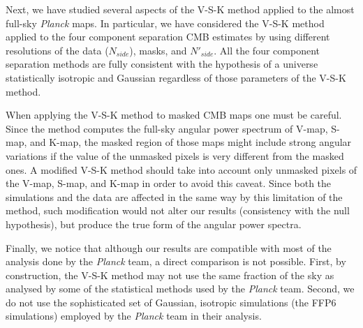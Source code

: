 Next, we have studied several aspects of the V-S-K method applied to the almost full-sky \textit{Planck} maps. In particular, we have considered the V-S-K method applied to the four component separation CMB estimates by using different resolutions of the data ($ N_{side} $), masks, and $ N'_{side} $. All the four component separation methods are fully consistent with the hypothesis of a universe statistically isotropic and Gaussian regardless of those parameters of the V-S-K method. 

When applying the V-S-K method to masked CMB maps one must be careful. Since the method computes the full-sky angular power spectrum of V-map, S-map, and K-map, the masked region of those maps might include strong angular variations if the value of the unmasked pixels is very different from the masked ones.  A modified V-S-K method should take into account only unmasked pixels of the V-map, S-map, and K-map in order to avoid this caveat. Since both the simulations and the data are affected in the same way by this limitation of the method, such modification would not alter our results (consistency with the null hypothesis), but produce the true form of the angular power spectra. 

Finally, we notice that although our results are compatible with most of the analysis done by the \textit{Planck} team, a direct comparison is not possible. First, by construction, the V-S-K method may not use the same fraction of the sky as analysed by some of the statistical methods used by the \textit{Planck} team. Second, we do not use the sophisticated set  of Gaussian, isotropic simulations  (the FFP6 simulations) employed by the \textit{Planck} team in their analysis. 
